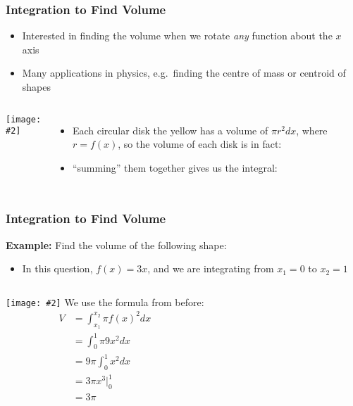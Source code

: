 \documentclass[12pt,compress,aspectratio=169]{beamer}
\newcommand{\pic}[2]{\texttt{[image: \#2]}}
\begin{document}
\begin{frame}
  \frametitle{Integration to Find Volume}
  \begin{itemize}
  \item Interested in finding the volume when we rotate \emph{any} function
    about the $x$ axis
  \item Many applications in physics, e.g.\ finding the centre of
    mass or centroid of shapes
  \end{itemize}
  \begin{columns}
    \pic{1}{cone.png}
    \begin{itemize}
    \item Each circular disk the yellow has a volume of $\pi r^2dx$,
      where $r=f(x)$, so the volume of each disk is in fact:
      
    \item ``summing'' them together gives us the integral:
      
    \end{itemize}
  \end{columns}
\end{frame}

\begin{frame}
  \frametitle{Integration to Find Volume}
  \textbf{Example:} Find the volume of the following shape:
  \begin{itemize}
  \item In this question, $f(x)=3x$, and we are integrating from $x_1=0$ to
    $x_2=1$
  \end{itemize}
  \vspace{.1in}
  \begin{columns}
    \pic{1}{cone.png}
    We use the formula from before:
    \begin{align*}
      V&=\int_{x_1}^{x_2} \pi f(x)^{2} dx\\
      &=\int_{0}^{1} \pi 9x^2dx\\
      &=9\pi\int_{0}^{1} x^2dx\\
      &=3\pi x^3\Big|^1_0\\
      &=3\pi
    \end{align*}
  \end{columns}
\end{frame}
\end{document}
